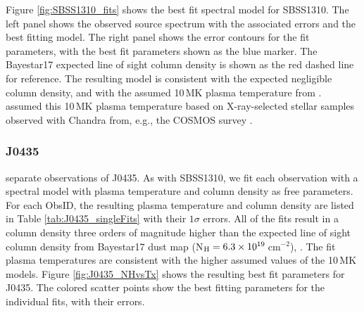 \documentclass[twocolumn, tighten, times, astrosymb]{aastex631}
\begin{document}
\begin{figure*}
\caption{Best fitting spectral model for SBSS13010. The left panel, (a), shows the observed source spectrum in black  with the associated errors. The best fitting model is shown as the solid red line. The right panel, (b), shows the contours for the plasma temperature and column density, with the  $1\sigma$, $2\sigma$, $3\sigma$ contours shown as the solid, dashed and dotted lines respectively.  The best fit parameters are shown as the blue marker, with the $1\sigma$ errors. The Bayestar17 expected line of sight column density is shown as the red dashed line for reference.}
\label{fig:SBSS1310_fits}
\end{figure*}


Figure \ref{fig:SBSS1310_fits} shows the best fit spectral model for SBSS1310. The left panel shows the observed source spectrum with the associated errors and the best fitting model. The right panel shows the error contours for the fit parameters, with the best fit parameters shown as the blue marker. The Bayestar17 expected line of sight column density is shown as the red dashed line for reference. The resulting model is consistent with the expected negligible column density, and with the assumed 10\,MK plasma temperature from \citep{Green2019}. \citet{Green2019} assumed this 10\,MK plasma temperature based on X-ray-selected stellar samples observed with Chandra from, e.g., the COSMOS survey \citep{Wright2010}.
\subsubsection{J0435}\label{sec:J0435_indfit}

 separate observations of J0435. As with SBSS1310, we fit each observation with a spectral model with plasma temperature and column density as free parameters. For each ObsID, the resulting plasma temperature and column density are listed in Table \ref{tab:J0435_singleFits} with their $1\sigma$ errors. All of the fits result in a column density three orders of magnitude higher than the expected line of sight column density from Bayestar17 dust map (N$_{\rm H} = 6.3\times10^{19}$\,cm$^{-2}$), . The fit plasma temperatures are consistent with the higher assumed values of the 10\,MK models. Figure \ref{fig:J0435_NHvsTx} shows the resulting best fit parameters for J0435. The colored scatter points show the best fitting parameters for the individual fits, with their errors.  
\end{document}
